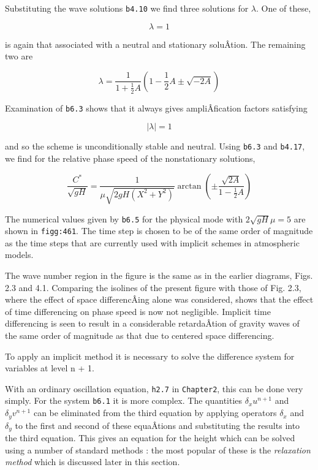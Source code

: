 Substituting the wave solutions \texttt{b4.10} we find three solutions
for \(\lambda\). One of these,

{\[\lambda = 1\]}

is again that associated with a neutral and stationary soluÂ­tion. The
remaining two are

{\[\lambda = \frac{1}{1 + \frac{1}{2}A}\left( 1 - \frac{1}{2}A \pm \sqrt{- 2A} \right)\]}

Examination of \texttt{b6.3} shows that it always gives ampliÂ­fication
factors satisfying

{\[\left| \lambda \right| = 1\]}

and so the scheme is unconditionally stable and neutral. Using
\texttt{b6.3} and \texttt{b4.17}, we find for the relative phase speed
of the nonstationary solutions,

{\[\frac{C^{*}}{\sqrt{gH}} = \frac{1}{\mu\sqrt{2gH(X^{2} + Y^{2})}}\arctan{( \pm \frac{\sqrt{2A}}{1 - \frac{1}{2}A} )}\]}

The numerical values given by \texttt{b6.5} for the physical mode with
\(2\sqrt{gH}\mu = 5\) are shown in \texttt{figg:461}. The time step is
chosen to be of the same order of magnitude as the time steps that are
currently used with implicit schemes in atmospheric models.


The wave number region in the figure is the same as in the earlier
diagrams, Figs. 2.3 and 4.1. Comparing the isolines of the present
figure with those of Fig. 2.3, where the effect of space differencÂ­ing
alone was considered, shows that the effect of time differencing on
phase speed is now not negligible. Implicit time differencing is seen to
result in a considerable retardaÂ­tion of gravity waves of the same order
of magnitude as that due to centered space differencing.

To apply an implicit method it is necessary to solve the difference
system for variables at level n + 1.

With an ordinary oscillation equation, \texttt{h2.7} in
\texttt{Chapter2}, this can be done very simply. For the system
\texttt{b6.1} it is more complex. The quantities \(\delta_{x}u^{n + 1}\)
and \(\delta_{y}v^{n + 1}\) can be eliminated from the third equation by
applying operators \(\delta_{x}\) and \(\delta_{y}\) to the first and
second of these equaÂ­tions and substituting the results into the third
equation. This gives an equation for the height which can be solved
using a number of standard methods : the most popular of these is the
\emph{relaxation method} which is discussed later in this section.

